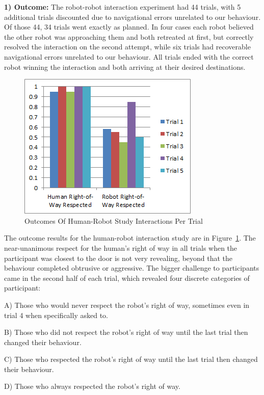\documentclass[letterpaper, 10 pt, conference]{ieeeconf}  %
\begin{document}
\textbf{1) Outcome:} The robot-robot interaction experiment had 44 trials, with 5 additional trials discounted due to navigational errors unrelated to our behaviour. Of those 44, 34 trials went exactly as planned.  In four cases each robot believed the other robot was approaching them and both retreated at first, but correctly resolved the interaction on the second attempt, while six trials had recoverable navigational errors unrelated to our behaviour. All trials ended with the correct robot winning the interaction and both arriving at their desired destinations.

     \begin{figure}
      \centering
      \includegraphics{outcomes.png}
      \caption{Outcomes Of Human-Robot Study Interactions Per Trial}
      \label{fig:Outcomes}
   \end{figure}

The outcome results for the human-robot interaction study are in Figure~\ref{fig:Outcomes}. The near-unanimous respect for the human's right of way in all trials when the participant was closest to the door is not very revealing, beyond that the behaviour completed obtrusive or aggressive. The bigger challenge to participants came in the second half of each trial, which revealed four discrete categories of participant: 

A) Those who would never respect the robot's right of way, sometimes even in trial 4 when specifically asked to. 

B) Those who did not respect the robot's right of way until the last trial then changed their behaviour. 

C) Those who respected the robot's right of way until the last trial then changed their behaviour. 

D) Those who always respected the robot's right of way. 
\end{document}
